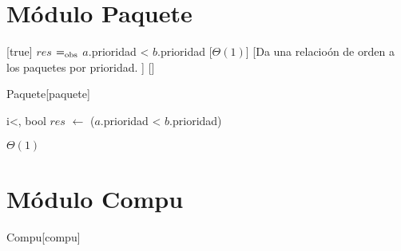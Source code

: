 \section{M\'{o}dulo Paquete}
  \begin{Interfaz}
    [true]%
    {$res$ $=_{\mathrm{obs}}$ $a$.prioridad < $b$.prioridad}%
    [$\Theta(1)$]%
    [Da una relacio\'on de orden a los paquetes por prioridad. ]%
    []%
  \end{Interfaz}
  \begin{Representacion}
    \begin{Estructura}{Paquete}[paquete]
      \begin{Tupla}[paquete]
      \end{Tupla}
    \end{Estructura}
  \end{Representacion}
  \begin{algoritmo}{i<}{, }{bool}
    $res$ $\gets$ ($a$.prioridad < $b$.prioridad)
  \end{algoritmo}
  \datosAlgoritmo{} %
  {} %
  {} %
  {$\Theta(1)$} %
  {} %

\section{M\'{o}dulo Compu}
  \begin{Representacion}
    \begin{Estructura}{Compu}[compu]
      \begin{Tupla}[compu]
      \end{Tupla}
    \end{Estructura}
  \end{Representacion}
